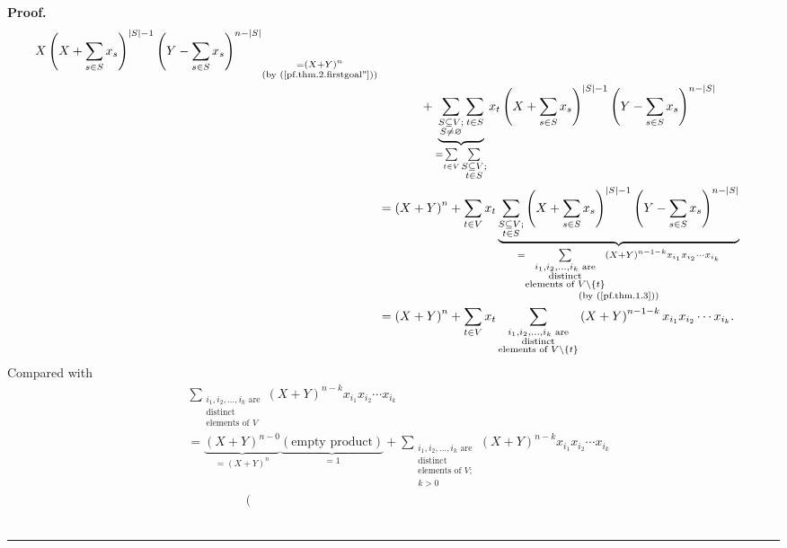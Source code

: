\documentclass[numbers=enddot,12pt,final,onecolumn,notitlepage]{scrartcl}%
\theoremstyle{definition}
\newenvironment{proof}[1][Proof]{\noindent\textbf{#1.} }{\ \rule{0.5em}{0.5em}}
\let\sumnonlimits\sum
\renewcommand{\sum}{\sumnonlimits\limits}
\newenvironment{vershort}{}{}
\begin{document}
\begin{vershort}
\begin{proof}
\begin{align*}
{{{}}X\left(  X+\sum_{s\in S}x_{s}\right)  ^{\left\vert S\right\vert -1}\left(
Y-\sum_{s\in S}x_{s}\right)  ^{n-\left\vert S\right\vert }}%
_{\substack{=\left(  X+Y\right)  ^{n}\\\text{(by (\ref{pf.thm.2.firstgoal''}%
))}}}\\
&  \ \ \ \ \ \ \ \ \ \ +\underbrace{\sum_{\substack{S\subseteq V;\\S\neq
\varnothing}}\sum_{t\in S}}_{=\sum_{t\in V}\sum_{\substack{S\subseteq V;\\t\in
S}}}x_{t}\left(  X+\sum_{s\in S}x_{s}\right)  ^{\left\vert S\right\vert
-1}\left(  Y-\sum_{s\in S}x_{s}\right)  ^{n-\left\vert S\right\vert }\\
&  =\left(  X+Y\right)  ^{n}+\sum_{t\in V}x_{t}\underbrace{\sum
_{\substack{S\subseteq V;\\t\in S}}\left(  X+\sum_{s\in S}x_{s}\right)
^{\left\vert S\right\vert -1}\left(  Y-\sum_{s\in S}x_{s}\right)
^{n-\left\vert S\right\vert }}_{\substack{=\sum_{\substack{i_{1},i_{2}%
,\ldots,i_{k}\text{ are}\\\text{distinct}\\\text{elements of }V\setminus
\left\{  t\right\}  }}\left(  X+Y\right)  ^{n-1-k}x_{i_{1}}x_{i_{2}}\cdots
x_{i_{k}}\\\text{(by (\ref{pf.thm.1.3}))}}}\\
&  =\left(  X+Y\right)  ^{n}+\sum_{t\in V}x_{t}\sum_{\substack{i_{1}%
,i_{2},\ldots,i_{k}\text{ are}\\\text{distinct}\\\text{elements of }%
V\setminus\left\{  t\right\}  }}\left(  X+Y\right)  ^{n-1-k}x_{i_{1}}x_{i_{2}%
}\cdots x_{i_{k}}.
\end{align*}
Compared with%
\begin{align*}
&  \sum_{\substack{i_{1},i_{2},\ldots,i_{k}\text{ are}\\\text{distinct}%
\\\text{elements of }V}}\left(  X+Y\right)  ^{n-k}x_{i_{1}}x_{i_{2}}\cdots
x_{i_{k}}\\
&  =\underbrace{\left(  X+Y\right)  ^{n-0}}_{=\left(  X+Y\right)  ^{n}%
}\underbrace{\left(  \text{empty product}\right)  }_{=1}+\sum_{\substack{i_{1}%
,i_{2},\ldots,i_{k}\text{ are}\\\text{distinct}\\\text{elements of }%
V;\\k>0}}\left(  X+Y\right)  ^{n-k}x_{i_{1}}x_{i_{2}}\cdots x_{i_{k}}\\
&  \ \ \ \ \ \ \ \ \ \ \ \ \ \ \ \ \ \ \ \ \left(

\end{align*}
\end{proof}
\end{vershort}
\end{document}
